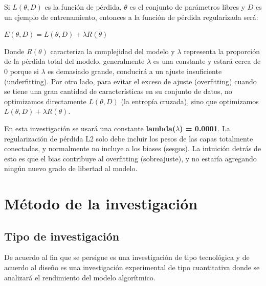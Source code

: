 		Si $L(\theta, D)$ es la función de pérdida, $\theta$ es el conjunto de parámetros libres y $D$ es un ejemplo de entrenamiento, entonces a la función de pérdida regularizada será:

			\begingroup\makeatletter{}\check@mathfonts
			\begin{center}
			$E(\theta,D) =L(\theta,D) +\lambda R(\theta)$
			\end{center}
			\endgroup
		

		Donde $R(\theta)$ caracteriza la complejidad del modelo y $\lambda$ representa la proporción de la pérdida total del modelo, generalmente $\lambda$ es una constante y estará cerca de 0 porque si $\lambda$ es demasiado grande, conducirá a un ajuste insuficiente (underfitting). Por otro lado, para evitar el exceso de ajuste (overfitting) cuando se tiene una gran cantidad de características en su conjunto de datos, no optimizamos directamente $L(\theta,D)$ (la entropía cruzada), sino que optimizamos $L(\theta,D) +\lambda R(\theta)$.

		\newpage
		En esta investigación se usará una constante {\bf lambda($\lambda$) = 0.0001}. La regularización de pérdida L2 solo debe incluir los pesos de las capas totalmente conectadas, y normalmente no incluye a los biases (sesgos). La intuición detrás de esto es que el bias contribuye al overfitting (sobreajuste), y no estaría agregando ningún nuevo grado de libertad al modelo.





\section{Método de la investigación}

\subsection{ Tipo de investigación}
	De acuerdo al fin que se persigue es una investigación de tipo tecnológica y de acuerdo al diseño es una investigación experimental de tipo cuantitativa donde se analizará el rendimiento del modelo algorítmico.

